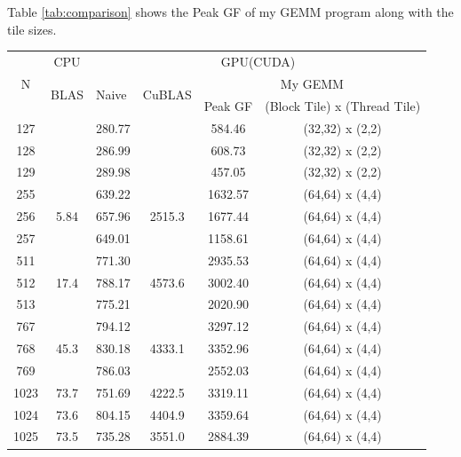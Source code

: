 \documentclass{article}
\begin{document}
\section{}
Table \ref{tab:comparison} shows the Peak GF of my GEMM program along with the tile sizes.
\begin{table}[]
\centering
\begin{tabular}{|c|c|c|c|c|c|}
\hline
\multirow{3}{*}{N} & \multicolumn{1}{c|}{CPU} & \multicolumn{4}{c|}{GPU(CUDA)}                                                                                                                           \\ \cline{2-6} 
                    & \multirow{2}{*}{BLAS}    & \multicolumn{1}{l|}{\multirow{2}{*}{Naive}} & \multicolumn{1}{l|}{\multirow{2}{*}{CuBLAS}} & \multicolumn{2}{c|}{My GEMM}                                \\ \cline{5-6} 
                    &                          & \multicolumn{1}{l|}{}                       & \multicolumn{1}{l|}{}                        & \multicolumn{1}{c|}{Peak GF} & (Block Tile) x (Thread Tile) \\ \hline
127  &      & 280.77 &        & 584.46  & (32,32) x (2,2)\\
128  &      & 286.99 &        & 608.73  & (32,32) x (2,2)\\
129  &      & 289.98 &        & 457.05  & (32,32) x (2,2)\\
255  &      & 639.22 &        & 1632.57 & (64,64) x (4,4)\\
256  & 5.84 & 657.96 & 2515.3 & 1677.44 & (64,64) x (4,4)\\
257  &      & 649.01 &        & 1158.61 & (64,64) x (4,4)\\
511  &      & 771.30 &        & 2935.53 & (64,64) x (4,4)\\
512  & 17.4 & 788.17 & 4573.6 & 3002.40 & (64,64) x (4,4)\\
513  &      & 775.21 &        & 2020.90 & (64,64) x (4,4)\\
767  &      & 794.12 &        & 3297.12 & (64,64) x (4,4)\\
768  & 45.3 & 830.18 & 4333.1 & 3352.96 & (64,64) x (4,4)\\
769  &      & 786.03 &        & 2552.03 & (64,64) x (4,4)\\
1023 & 73.7 & 751.69 & 4222.5 & 3319.11 & (64,64) x (4,4)\\
1024 & 73.6 & 804.15 & 4404.9 & 3359.64 & (64,64) x (4,4)\\
1025 & 73.5 & 735.28 & 3551.0 & 2884.39 & (64,64) x (4,4)\\

\end{tabular}
\end{table}
\end{document}
